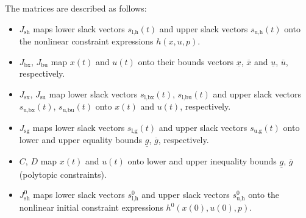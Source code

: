 \documentclass[english]{article}
\newcommand{\ind}[1]{_{\textrm{#1}}}
\newcommand{\initial}{^{\textrm{0}}}
\begin{document}
The matrices are described as follows:
\begin{itemize}
    \item $J\ind{sh}$ maps lower slack vectors $s\ind{l,h}(t)$ and upper slack vectors $s\ind{u,h}(t)$ onto the nonlinear constraint expressions $h(x,u,p)$.
    \item $J\ind{bx}$, $J\ind{bu}$ map $x(t)$ and $u(t)$ onto their bounds vectors $\underline{x}$, $\overline{x}$ and $\underline{u}$, $\overline{u}$, respectively.
    \item $J\ind{sx}$, $J\ind{su}$ map lower slack vectors $s\ind{l,bx}(t)$, $s\ind{l,bu}(t)$ and upper slack vectors $s\ind{u,bx}(t)$, $s\ind{u,bu}(t)$ onto $x(t)$ and $u(t)$, respectively.
    \item $J\ind{sg}$ maps lower slack vectors $s\ind{l,g}(t)$ and upper slack vectors $s\ind{u,g}(t)$ onto lower and upper equality bounds $\underline{g}$, $\overline{g}$, respectively.
    \item $C$, $D$ map $x(t)$ and $u(t)$ onto lower and upper inequality bounds $\underline{g}$, $\overline{g}$ (polytopic constraints).
    \item $J\ind{sh}\initial$ maps lower slack vectors $s\ind{l,h}\initial$ and upper slack vectors $s\ind{u,h}\initial$ onto the nonlinear initial constraint expressions $h\initial(x(0),u(0),p)$.
\end{itemize}
\end{document}
